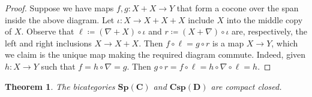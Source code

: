 \documentclass[11pt]{amsart}
\newcommand{\from}{\colon}
\newcommand{\bispmap}[1]{\mathbf{Sp(#1)}}
\newcommand{\bicspmap}[1]{\mathbf{Csp(#1)}}
\newtheorem{thm}{Theorem}[section]
\theoremstyle{remark}
\theoremstyle{definition}
\begin{document}
\begin{proof}
	Suppose we have maps $f,g \from X+X \to Y$ that form a cocone over the span inside the above diagram. Let $\iota \from X \to X+X+X$ include $X$ into the middle copy of $X$. Observe that $\ell \coloneqq (\nabla + X) \circ \iota$ and $r \coloneqq (X + \nabla) \circ \iota$ are, respectively, the left and right inclusions $X \to X+X$. Then $f \circ \ell = g \circ r$ is a map $X \to Y$, which we claim is the unique map making the required diagram commute. Indeed, given $h \from X \to Y$ such that $f = h \circ \nabla = g$.  Then $g \circ r = f \circ \ell = h \circ \nabla \circ \ell = h$.
\end{proof}

\begin{thm}
	\label{thm:SpansMapsAreCCBicat}
	The bicategories $\bispmap{C}$ and $\bicspmap{D}$ are compact closed.
\end{thm}
\end{document}
